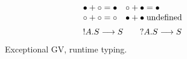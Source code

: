\begin{figure*}
\begin{mdframed}
\begin{highlight}
    \begin{minipage}[t]{0.4\textwidth}
      \[
        \begin{array}{ll}
          \relax{\bullet}  + \relax{\circ} = \relax{\bullet}
          &
            \relax{\circ} + \relax{\bullet}  = \relax{\bullet}
          \\
          \relax{\circ} + \relax{\circ} = \relax{\circ}
          &
            \relax{\bullet}  + \relax{\bullet} \; \text{undefined}
        \end{array}
      \]
      \[
        \relax{\relax{\relax{!}\relax{A}\relax{.}\relax{S}}}\mathrel{\relax{\longrightarrow}}\relax{\relax{S}}
        \qquad
        \relax{\relax{\relax{?}\relax{A}\relax{.}\relax{S}}}\mathrel{\relax{\longrightarrow}}\relax{\relax{S}}
      \]
    \end{minipage}%
    \hspace*{0.05\textwidth}%
    \begin{minipage}[t]{0.55\textwidth}
      \begin{center}
        \begin{prooftree*}
        \end{prooftree*}

        \begin{prooftree*}
        \end{prooftree*}
        \begin{prooftree*}
        \end{prooftree*}
      \end{center}
    \end{minipage}%
  \end{highlight}\end{mdframed}
  \caption{Exceptional GV, runtime typing.}
  \label{fig:egv-runtime-typing}
\end{figure*}

